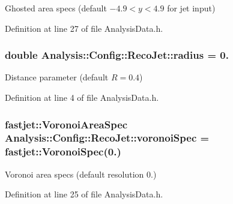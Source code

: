 Ghosted area specs (default $ -4.9 < y < 4.9 $ for jet input) 



Definition at line 27 of file Analysis\+Data.\+h.

\subsubsection[{\texorpdfstring{radius}{radius}}]{\setlength{\rightskip}{0pt plus 5cm}double Analysis\+::\+Config\+::\+Reco\+Jet\+::radius = 0.\hspace{0.3cm}{\ttfamily [static]}}\hypertarget{namespaceAnalysis_1_1Config_1_1RecoJet_a794023c376e6d0221d52f71275229b41}{}\label{namespaceAnalysis_1_1Config_1_1RecoJet_a794023c376e6d0221d52f71275229b41}


Distance parameter (default $ R = 0.4 $) 



Definition at line 4 of file Analysis\+Data.\+h.

\subsubsection[{\texorpdfstring{voronoi\+Spec}{voronoiSpec}}]{\setlength{\rightskip}{0pt plus 5cm}fastjet\+::\+Voronoi\+Area\+Spec Analysis\+::\+Config\+::\+Reco\+Jet\+::voronoi\+Spec = fastjet\+::\+Voronoi\+Spec(0.)\hspace{0.3cm}{\ttfamily [static]}}\hypertarget{namespaceAnalysis_1_1Config_1_1RecoJet_a851b86d5a4096ee867e561f0489a4062}{}\label{namespaceAnalysis_1_1Config_1_1RecoJet_a851b86d5a4096ee867e561f0489a4062}


Voronoi area specs (default resolution 0.) 



Definition at line 25 of file Analysis\+Data.\+h.

